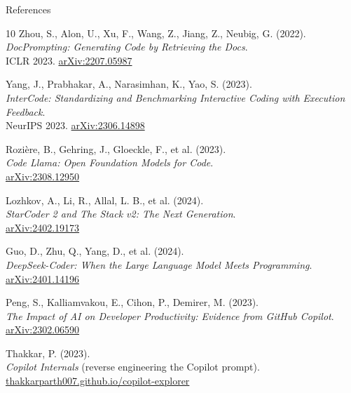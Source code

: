 \begin{frame}[allowframebreaks]{References}
\begin{thebibliography}{10}
      Zhou, S., Alon, U., Xu, F., Wang, Z., Jiang, Z., Neubig, G. (2022). \\
      \emph{DocPrompting: Generating Code by Retrieving the Docs}.\\
      ICLR 2023. \href{https://arxiv.org/abs/2207.05987}{arXiv:2207.05987}

      Yang, J., Prabhakar, A., Narasimhan, K., Yao, S. (2023). \\
      \emph{InterCode: Standardizing and Benchmarking Interactive Coding with Execution Feedback}.\\
      NeurIPS 2023. \href{https://arxiv.org/abs/2306.14898}{arXiv:2306.14898}

      Rozi\`ere, B., Gehring, J., Gloeckle, F., et al. (2023). \\
      \emph{Code Llama: Open Foundation Models for Code}.\\
      \href{https://arxiv.org/abs/2308.12950}{arXiv:2308.12950}

      Lozhkov, A., Li, R., Allal, L. B., et al. (2024). \\
      \emph{StarCoder 2 and The Stack v2: The Next Generation}.\\
      \href{https://arxiv.org/abs/2402.19173}{arXiv:2402.19173}

      Guo, D., Zhu, Q., Yang, D., et al. (2024). \\
      \emph{DeepSeek-Coder: When the Large Language Model Meets Programming}.\\
      \href{https://arxiv.org/abs/2401.14196}{arXiv:2401.14196}

      Peng, S., Kalliamvakou, E., Cihon, P., Demirer, M. (2023). \\
      \emph{The Impact of AI on Developer Productivity: Evidence from GitHub Copilot}.\\
      \href{https://arxiv.org/abs/2302.06590}{arXiv:2302.06590}

      Thakkar, P. (2023). \\
      \emph{Copilot Internals} (reverse engineering the Copilot prompt).\\
      \href{https://thakkarparth007.github.io/copilot-explorer/posts/copilot-internals}{thakkarparth007.github.io/copilot-explorer}
  \end{thebibliography}
\end{frame}

